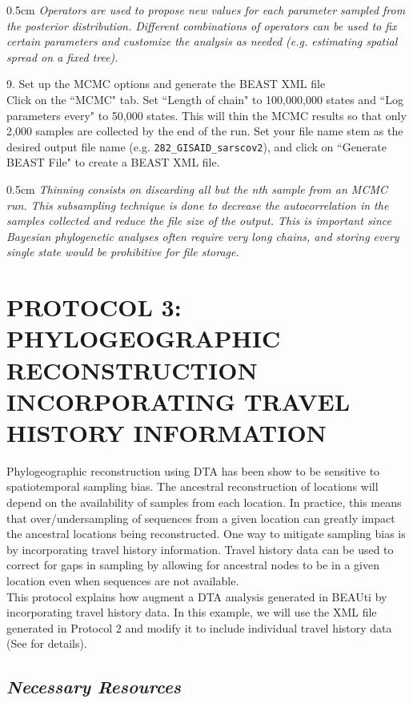 \documentclass{article}
\newcommand{\ann}[1]{
\begin{adjustwidth}{0.5cm}{}
\it{#1}\\
\end{adjustwidth}}
\begin{document}
\ann{Operators are used to propose new values for each parameter sampled from the posterior distribution. Different combinations of operators can be used to fix certain parameters and customize the analysis as needed (e.g. estimating spatial spread on a fixed tree).}

9. Set up the MCMC options and generate the BEAST XML file\\

Click on the ``MCMC" tab. Set ``Length of chain" to 100,000,000 states and ``Log parameters every" to 50,000 states. This will thin the MCMC results so that only 2,000 samples are collected by the end of the run. Set your file name stem as the desired output file name (e.g. \texttt{282\_GISAID\_sarscov2}), and click on ``Generate BEAST File" to create a BEAST XML file.\\

\ann{Thinning consists on discarding all but the nth sample from an MCMC run. This subsampling technique is done to decrease the autocorrelation in the samples collected and reduce the file size of the output. This is important since Bayesian phylogenetic analyses often require very long chains, and storing every single state would be prohibitive for file storage.}

\section*{PROTOCOL 3: PHYLOGEOGRAPHIC RECONSTRUCTION INCORPORATING TRAVEL HISTORY INFORMATION}

Phylogeographic reconstruction using DTA has been show to be sensitive to spatiotemporal sampling bias. The ancestral reconstruction of locations will depend on the availability of samples from each location. In practice, this means that over/undersampling of sequences from a given location can greatly impact the ancestral locations being reconstructed. One way to mitigate sampling bias is by incorporating travel history information. Travel history data can be used to correct for gaps in sampling by allowing for ancestral nodes to be in a given location even when sequences are not available.\\

This protocol explains how augment a DTA analysis generated in BEAUti by incorporating travel history data. In this example, we will use the XML file generated in Protocol 2 and modify it to include individual travel history data (See \cite{travhist} for details).

\subsection*{\textbf{\textit{Necessary Resources}}}
\end{document}
